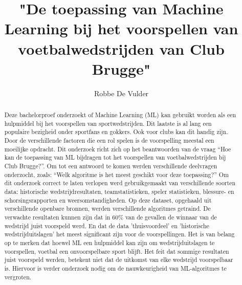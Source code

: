 \documentclass{hogent-article}
\title{"De toepassing van Machine Learning bij het voorspellen van voetbalwedstrijden van Club Brugge"}
\author{Robbe De Vulder}
\begin{document}
\begin{abstract}

Deze bachelorproef onderzoekt of Machine Learning (ML) kan gebruikt worden als een hulpmiddel bij het voorspellen van sportwedstrijden. Dit laatste is al lang een populaire bezigheid onder sportfans en gokkers. Ook voor clubs kan dit handig zijn. Door de verschillende factoren die een rol spelen is de voorspelling meestal een moeilijke opdracht.
Dit onderzoek richt zich op het beantwoorden van de vraag “Hoe kan de toepassing van ML bijdragen tot het voorspellen van voetbalwedstrijden bij Club Brugge?”. Om tot een antwoord te komen werden verschillende deelvragen onderzocht, zoals:  “Welk algoritme is het meest geschikt voor deze toepassing?”
Om dit onderzoek correct te laten verlopen werd gebruikgemaakt van verschillende soorten data: historische wedstrijdresultaten, teamstatistieken, speler statistieken, blessure- en schorsingsrapporten en weersomstandigheden. Op deze dataset, opgehaald uit verschillende openbare bronnen, werden verschillende algoritmes getraind.
De verwachte resultaten kunnen zijn dat in 60\% van de gevallen de winnaar van de wedstrijd juist voorspeld werd. En dat de data 'thuisvoordeel' en 'historische wedstrijduitslagen' het meest significant zijn voor de voorspellingen.
Het is van belang op te merken dat hoewel ML een hulpmiddel kan zijn om wedstrijduitslagen te voorspellen, voetbal een onvoorspelbare sport blijft. Het feit dat sommige resultaten juist voorspeld werden, betekent niet dat de uitkomst van elke wedstrijd voorspelbaar is. Hiervoor is verder onderzoek nodig om de nauwkeurigheid van ML-algoritmes te vergroten.  
  
\end{abstract}

\tableofcontents



\printbibliography[heading=bibintoc]
\end{document}
